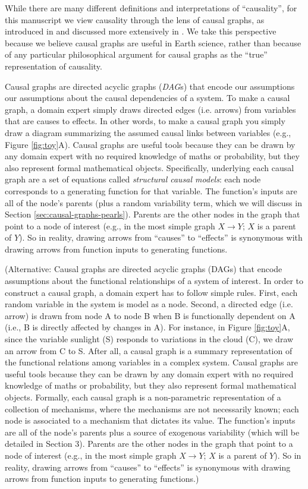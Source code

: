 \documentclass[12pt]{article}
\begin{document}
While there are many different definitions and interpretations of
``causality'', for this manuscript we view causality through the lens
of causal graphs, as introduced in \citet{pearl1995causal} and
discussed more extensively in \citet{pearl2009causality}. We take this
perspective because we believe causal graphs are useful in Earth
science, rather than because of any particular philosophical argument
for causal graphs as the ``true'' representation of causality.

Causal graphs are directed acyclic graphs (\emph{DAG}s) that encode
our assumptions our assumptions about the causal dependencies of a
system. To make a causal graph, a domain expert simply draws directed
edges (i.e. arrows) from variables that are causes to effects. In
other words, to make a causal graph you simply draw a diagram
summarizing the assumed causal links between variables (e.g., Figure
\ref{fig:toy}A). Causal graphs are useful tools because they can be
drawn by any domain expert with no required knowledge of maths or
probability, but they also represent formal mathematical
objects. Specifically, underlying each causal graph are a set of
equations called \emph{structural causal models}: each node
corresponds to a generating function for that variable. The function's
inputs are all of the node's parents (plus a random variability term,
which we will discuss in Section
\ref{sec:causal-graphs-pearls}). Parents are the other nodes in the
graph that point to a node of interest (e.g., in the most simple graph
$X \to Y$; $X$ is a parent of $Y$). So in reality, drawing arrows from
``causes'' to ``effects'' is synonymous with drawing arrows from
function inputs to generating functions.

(Alternative: Causal graphs are directed acyclic graphs (DAGs) that
encode assumptions about the functional relationships of a system of
interest. In order to construct a causal graph, a domain expert has to
follow simple rules. First, each random variable in the system is
model as a node. Second, a directed edge (i.e. arrow) is drawn from
node A to node B when B is functionally dependent on A (i.e., B is
directly affected by changes in A). For instance, in Figure
\ref{fig:toy}A, since the variable sunlight (S) responds to variations
in the cloud (C), we draw an arrow from C to S. After all, a causal
graph is a summary representation of the functional relations among
variables in a complex system. Causal graphs are useful tools because
they can be drawn by any domain expert with no required knowledge of
maths or probability, but they also represent formal mathematical
objects. Formally, each causal graph is a non-parametric
representation of a collection of mechanisms, where the mechanisms are
not necessarily known; each node is associated to a mechanism that
dictates its value. The function's inputs are all of the node's
parents plus a source of exogenous variability (which will be detailed
in Section 3). Parents are the other nodes in the graph that point to
a node of interest (e.g., in the most simple graph $X \to Y$; $X$ is a
parent of $Y$). So in reality, drawing arrows from ``causes'' to
``effects'' is synonymous with drawing arrows from function inputs to
generating functions.)
\end{document}
